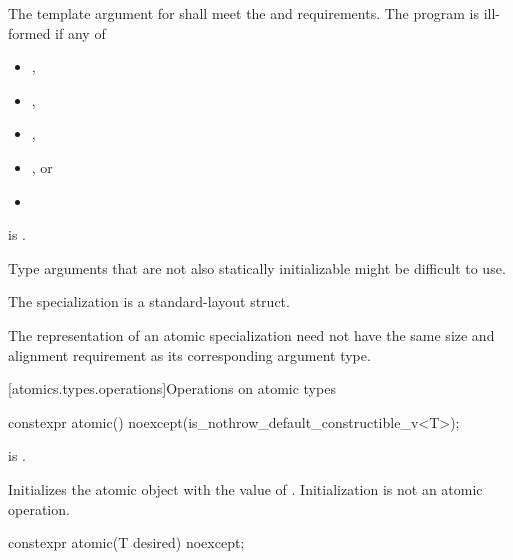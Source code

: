 %
\pnum
The template argument for  shall meet the
 and  requirements.
The program is ill-formed if any of
\begin{itemize}
\item {},
\item {},
\item {},
\item {}, or
\item {}
\end{itemize}
is .
\begin{note}
Type arguments that are
not also statically initializable might be difficult to use.
\end{note}

\pnum
The specialization  is a standard-layout struct.

\pnum
\begin{note}
The representation of an atomic specialization
need not have the same size and alignment requirement as
its corresponding argument type.
\end{note}

[atomics.types.operations]{Operations on atomic types}

%
%
%
%
\begin{itemdecl}
constexpr atomic() noexcept(is_nothrow_default_constructible_v<T>);
\end{itemdecl}

\begin{itemdescr}
\pnum
\mandates
{} is .

\pnum
\effects
Initializes the atomic object with the value of .
Initialization is not an atomic operation.
\end{itemdescr}

%
%
%
%
\begin{itemdecl}
constexpr atomic(T desired) noexcept;
\end{itemdecl}

